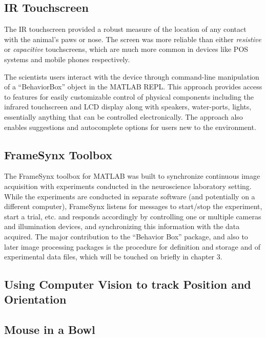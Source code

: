 \subsection{IR Touchscreen}\label{sec:ir-touchscreen}

The IR touchscreen provided a robust measure of the location of any contact with the animal's paws or nose.
The screen was more reliable than either \emph{resistive} or \emph{capacitive} touchscreens, which are much more common in devices like POS systems and mobile phones respectively.

The scientists users interact with the device through command-line manipulation of a ``BehaviorBox'' object in the MATLAB REPL.
This approach provides access to features for easily customizable control of physical components including the infrared touchscreen and LCD display along with speakers, water-ports, lights, essentially anything that can be controlled electronically.
The approach also enables suggestions and autocomplete options for users new to the environment.

\subsection{FrameSynx Toolbox}\label{sec:framesynx-toolbox}

The FrameSynx toolbox for MATLAB was built to synchronize continuous image acquisition with experiments conducted in the neuroscience laboratory setting.
While the experiments are conducted in separate software (and potentially on a different computer), FrameSynx listens for messages to start/stop the experiment, start a trial, etc. and responds accordingly by controlling one or multiple cameras and illumination devices, and synchronizing this information with the data acquired.
The major contribution to the ``Behavior Box'' package, and also to later image processing packages is the procedure for definition and storage and of experimental data files, which will be touched on briefly in chapter 3.

\subsection{Using Computer Vision to track Position and Orientation}\label{sec:using-computer-vision-to-track-position-and-orientation}

\subsection{Mouse in a Bowl}\label{sec:mouse-in-a-bowl}

